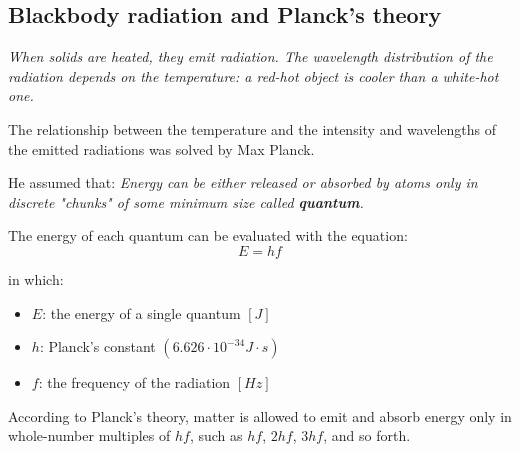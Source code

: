 \documentclass[12pt, a4paper]{report}
\newcommand{\hii}{\subsection}
\newcommand{\mul}{\cdot}
\begin{document}
    \hii{Blackbody radiation and Planck's theory}
        \textit{When solids are heated, they emit radiation. The wavelength distribution of
            the radiation depends on the temperature: a red-hot object is cooler than a
            white-hot one.}
        \par The relationship between the temperature and the intensity and wavelengths of the
            emitted radiations was solved by Max Planck.
        \par He assumed that: \textit{Energy can be either released or absorbed by atoms only in
            discrete "chunks" of some minimum size called \textbf{quantum}.}
        \par The energy of each quantum can be evaluated with the equation:
        \begin{equation}
            E = hf
        \end{equation}
        \par in which:
            \begin{itemize}
                \item $E$: the energy of a single quantum $[J]$
                \item $h$: Planck's constant $(6.626 \mul 10^{-34} J \mul s)$
                \item $f$: the frequency of the radiation $[Hz]$
            \end{itemize}
        \par According to Planck's theory, matter is allowed to emit and absorb energy only in
        whole-number multiples of $hf$, such as $hf$, $2hf$, $3hf$, and so forth.
\end{document}
